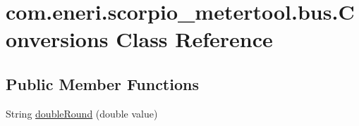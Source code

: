 \hypertarget{classcom_1_1eneri_1_1scorpio__metertool_1_1bus_1_1_conversions}{}\section{com.\+eneri.\+scorpio\+\_\+metertool.\+bus.\+Conversions Class Reference}
\label{classcom_1_1eneri_1_1scorpio__metertool_1_1bus_1_1_conversions}
\subsection*{Public Member Functions}
\begin{DoxyCompactItemize}
\item 
String \hyperlink{classcom_1_1eneri_1_1scorpio__metertool_1_1bus_1_1_conversions_a914d60d25ae82ee5f0354daa6705422d}{double\+Round} (double value)
\end{DoxyCompactItemize}
